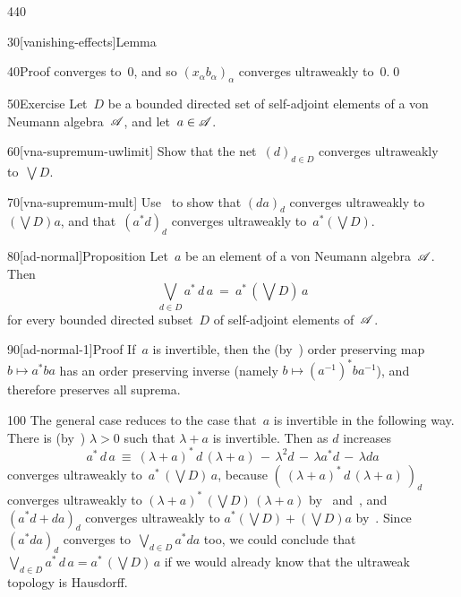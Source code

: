 \begin{parsec}{440}
\begin{point}{30}[vanishing-effects]{Lemma}
\begin{point}{40}{Proof}
converges to~$0$,
and so $(x_\alpha b_\alpha)_\alpha$ converges ultraweakly to~$0$.\qed
\end{point}
\end{point}
\begin{point}{50}{Exercise}%
Let~$D$ be a bounded directed set of self-adjoint
elements of a von Neumann algebra~$\mathscr{A}$,
and let~$a\in \mathscr{A}$.
\begin{point}{60}[vna-supremum-uwlimit]%
Show that the net~$(d)_{d\in D}$ converges ultraweakly to~$\bigvee D$.
\end{point}
\begin{point}{70}[vna-supremum-mult]%
Use~
to show that $(da)_d$ converges ultraweakly to~$(\bigvee D)a$,
and that~$(a^*d)_d$ converges ultraweakly to~$a^* (\bigvee D)$.
\end{point}
\end{point}
%
%
\begin{point}{80}[ad-normal]{Proposition}%
Let~$a$ be an element of a von Neumann algebra~$\mathscr{A}$.
Then
\begin{equation*}
	\textstyle
	\bigvee_{d\in D} a^*\,d\,a \ =\  a^*\,(\bigvee D)\, a
\end{equation*}
for every bounded directed subset~$D$ of self-adjoint
elements of~$\mathscr{A}$.
\begin{point}{90}[ad-normal-1]{Proof}%
If~$a$ is invertible,
then the (by~) order preserving map $b\mapsto a^*ba$
has an order preserving inverse (namely $b\mapsto (a^{-1})^* b a^{-1}$),
and therefore preserves all suprema.
\begin{point}{100}%
The general case reduces to the case that~$a$ 
is invertible
in the following way.
There is (by~)
 $\lambda>0$ such that $\lambda+a$ is invertible.
Then as $d$ increases 
\begin{equation*}
a^*\,d\,a \ \equiv\  (\lambda+a)^*\,d\,(\lambda+a) \,-\,
 \lambda^2d \,-\, \lambda a^*d \,-\, \lambda da
\end{equation*}
converges ultraweakly
to~$a^* \,(\bigvee D)\,a$,
because $(\ (\lambda+a)^*\,d\,(\lambda+a)\ )_d$
converges ultraweakly to $(\lambda+a)^*\,(\bigvee D)\,(\lambda+a)$
by~ and~,
and $(a^*d+da)_d$ converges ultraweakly to $a^*(\bigvee D)+(\bigvee D)a$
by~.
Since~$(a^*da)_d$ converges to~$\bigvee_{d\in D} a^*d a$ too,
we could conclude that
$\bigvee_{d\in D} a^* \,d\, a = a^*\,(\bigvee D)\,a$
if we would already know that the ultraweak topology is Hausdorff.

\end{point}
\end{point}
\end{point}
\end{parsec}

